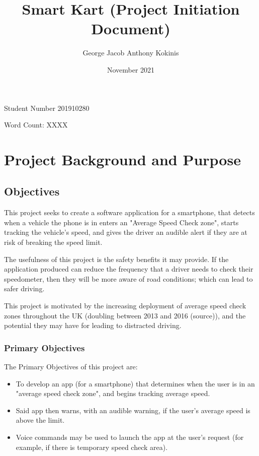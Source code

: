 \documentclass[11pt, a4paper, notitlepage]{report}
\title{Smart Kart (Project Initiation Document)}
\date{November 2021}
\author{George Jacob Anthony Kokinis}
\begin{document}
\maketitle
\begin{center}
    Student Number 201910280
    
    Word Count: XXXX %
\end{center}
\newpage

\tableofcontents

\chapter{Project Background and Purpose}
\section{Objectives}
This project seeks to create a software application for a smartphone, that 
detects when a vehicle the phone is in enters an "Average Speed Check zone", 
starts tracking the vehicle's speed, and gives the driver an audible alert if 
they are at risk of breaking the speed limit.

The usefulness of this project is the safety benefits it may provide. If the 
application produced can reduce the frequency that a driver needs to check 
their speedometer, then they will be more aware of road conditions; which can 
lead to safer driving.

This project is motivated by the increasing deployment of average speed check 
zones throughout the UK (doubling between 2013 and 2016 (source)), and the 
potential they may have for leading to distracted driving.

\subsection{Primary Objectives}\label{subsec:PrimaryObjectives}
The Primary Objectives of this project are:
\begin{itemize}
    \item To develop an app (for a smartphone) that determines when the user is 
    in an "average speed check zone", and begins tracking average speed.
    \item Said app then warns, with an audible warning, if the user's average 
    speed is above the limit.
    \item Voice commands may be used to launch the app at the user's request 
    (for example, if there is temporary speed check area).
\end{itemize}
\end{document}
